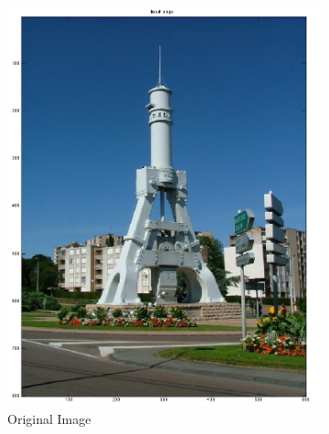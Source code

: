 \documentclass[12pt]{article}
\begin{document}
\begin{figure}[ht!]
        \centering
        \begin{subfigure}[b]{0.45\textwidth}
                \includegraphics[width=\textwidth]{e1}
                \caption{Original Image}
        \end{subfigure}%
        ~ 
        \begin{subfigure}[b]{0.45\textwidth}

\end{subfigure}
\end{figure}
\end{document}
